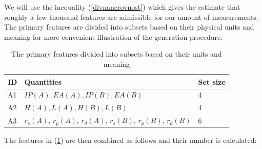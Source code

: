 \documentclass[11pt,oneside,czech,american]{book} %
\theoremstyle{plain}
\theoremstyle{definition}
\begin{document}
We will use the inequality (\ref{divnanerovnost}) which gives the estimate that roughly a few thousand features are admissible for our amount of measurements. The primary features are divided into subsets based on their physical units and meaning for more convenient illustration of the generation procedure.
\begin{table}[H]
	\centering
	\begin{tabular}{lll} 
		\hline
		ID & Quantities~ ~                                                                                        & Set size  \\ 
		\hline
		A1 & $IP(A), EA(A), IP(B), EA(B)     $                                                                      & 4   \\ 
		
		A2 & $H(A), L(A), H(B), L(B) $                                                                              & 4   \\ 
		
		A3 & $r_{s}(A)$, $r_{p}(A)$, $r_{d}(A)$, $r_{s}(B)$, $r_{p}(B)$, $r_{d}(B)$ & 6   \\
		\hline
	\end{tabular}
	\caption{The primary features divided into subsets based on their units and meaning}
	\label{primary}
\end{table}
The features in (\ref{primary}) are then combined as follows and their number is calculated:
\end{document}
